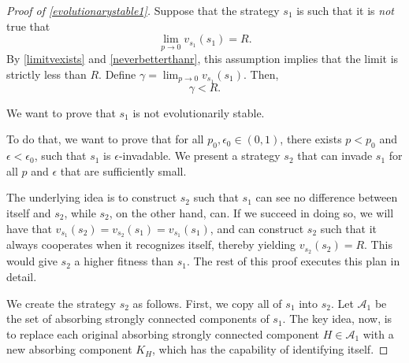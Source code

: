 \documentclass[11pt]{amsart}
\theoremstyle{definition}
\theoremstyle{remark}
\begin{document}
    \begin{proof}[Proof of \cref{evolutionarystable1}]
      Suppose that the strategy $s_1$ is such that it is \textit{not} true that \begin{equation*}
        \lim_{p \to 0 } v_{s_1}(s_1) = R.
      \end{equation*}
      By \cref{limitvexists} and \cref{neverbetterthanr}, this assumption implies that the limit is strictly less than $R$. Define $\gamma = \lim_{p \to 0} v_{s_1}(s_1)$. Then,
      \begin{equation*}
        \gamma < R.
      \end{equation*}
      
      We want to prove that $s_1$ is not evolutionarily stable. 
      
      To do that, we want to prove that for all $p_0, \epsilon_0 \in (0,1)$, there exists $p < p_0$ and $\epsilon < \epsilon_0$, such that $s_1$ is $\epsilon$-invadable. We present a strategy $s_2$ that can invade $s_1$ for all $p$ and $\epsilon$ that are sufficiently small.


      The underlying idea is to construct $s_2$ such that $s_1$ can see no difference between itself and $s_2$, while $s_2$, on the other hand, can. If we succeed in doing so, we will have that $v_{s_1}(s_2) = v_{s_2}(s_1) = v_{s_1}(s_1)$, and can construct $s_2$ such that it always cooperates when it recognizes itself, thereby yielding $v_{s_2}(s_2) = R$. This would give $s_2$ a higher fitness than $s_1$. The rest of this proof executes this plan in detail.

      We create the strategy $s_2$ as follows. First, we copy all of $s_1$ into $s_2$. Let $\mathcal{A}_1$ be the set of
       absorbing strongly connected components of $s_1$. The key idea, now, is to replace each original absorbing strongly connected component $H \in \mathcal{A}_1$ with a new absorbing component $K_H$, which has the capability of identifying itself.


\end{proof}
\end{document}
